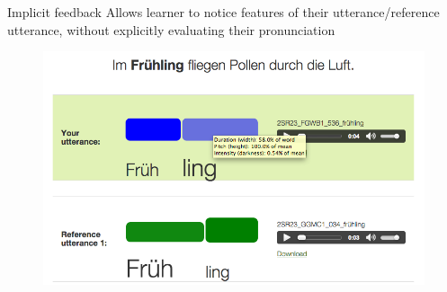 \documentclass[xcolor={dvipsnames}]{beamer}
\begin{document}
		\begin{frame}{Implicit feedback}
		Allows learner to notice features of their utterance/reference utterance, without explicitly evaluating their pronunciation
		\begin{figure}
		\includegraphics[width=\textwidth]{../img/screenshots/rectanglesWithOpacity}
		\end{figure}	
		\end{frame}
	
%
		
%		
%		
		
\end{document}
